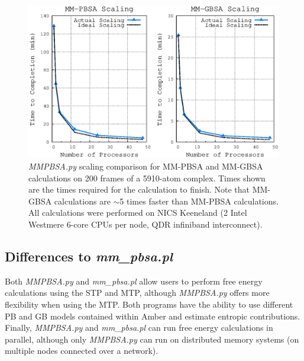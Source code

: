 \begin{figure}
   \includegraphics[width=6.5in]{MMPBSA_Scaling.eps}
   \caption[\emph{MMPBSA.py} scaling comparison for MM-PBSA and MM-GBSA
            calculations on 200 frames of a 5910-atom complex.]
           {\emph{MMPBSA.py} scaling comparison for MM-PBSA and MM-GBSA
            calculations on 200 frames of a 5910-atom complex. Times shown are
            the times required for the calculation to finish. Note that MM-GBSA
            calculations are $\sim$5 times faster than MM-PBSA calculations. All
            calculations were performed on NICS Keeneland (2 Intel Westmere
            6-core CPUs per node, QDR infiniband interconnect).}
   \label{fig6:MMPBSA_Scaling}
\end{figure}

\subsection{Differences to \emph{mm\_pbsa.pl}}

Both \emph{MMPBSA.py} and \emph{mm\_pbsa.pl} allow users to perform free energy
calculations using the STP and MTP, although \emph{MMPBSA.py} offers more
flexibility when using the MTP. Both programs have the ability to use different
PB and GB models contained within Amber and estimate entropic contributions.
Finally, \emph{MMPBSA.py} and \emph{mm\_pbsa.pl} can run free energy
calculations in parallel, although only \emph{MMPBSA.py} can run on distributed
memory systems (\ie on multiple nodes connected over a network).


